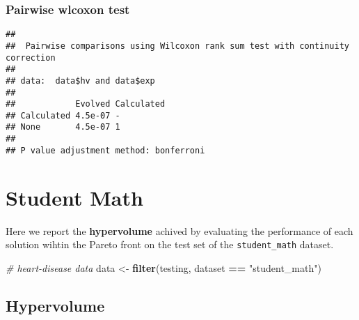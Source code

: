 \documentclass[
]{book}
\newenvironment{Shaded}{\begin{snugshade}}{\end{snugshade}}
\newcommand{\AttributeTok}[1]{\textcolor[rgb]{0.13,0.29,0.53}{#1}}
\newcommand{\CommentTok}[1]{\textcolor[rgb]{0.56,0.35,0.01}{\textit{#1}}}
\newcommand{\ConstantTok}[1]{\textcolor[rgb]{0.56,0.35,0.01}{#1}}
\newcommand{\FunctionTok}[1]{\textcolor[rgb]{0.13,0.29,0.53}{\textbf{#1}}}
\newcommand{\NormalTok}[1]{#1}
\newcommand{\OtherTok}[1]{\textcolor[rgb]{0.56,0.35,0.01}{#1}}
\newcommand{\SpecialCharTok}[1]{\textcolor[rgb]{0.81,0.36,0.00}{\textbf{#1}}}
\newcommand{\StringTok}[1]{\textcolor[rgb]{0.31,0.60,0.02}{#1}}
\begin{document}
\hypertarget{pairwise-wlcoxon-test}{%
\subsection{Pairwise wlcoxon test}\label{pairwise-wlcoxon-test}}

\begin{Shaded}
\end{Shaded}

\begin{verbatim}
## 
##  Pairwise comparisons using Wilcoxon rank sum test with continuity correction 
## 
## data:  data$hv and data$exp 
## 
##            Evolved Calculated
## Calculated 4.5e-07 -         
## None       4.5e-07 1         
## 
## P value adjustment method: bonferroni
\end{verbatim}

\hypertarget{student-math}{%
\chapter{Student Math}\label{student-math}}

Here we report the \textbf{hypervolume} achived by evaluating the performance of each solution wihtin the Pareto front on the test set of the \texttt{student\_math} dataset.

\begin{Shaded}
\begin{Highlighting}[]
\CommentTok{\# heart{-}disease data}
\NormalTok{data }\OtherTok{\textless{}{-}} \FunctionTok{filter}\NormalTok{(testing, dataset }\SpecialCharTok{==} \StringTok{"student\_math"}\NormalTok{)}
\end{Highlighting}
\end{Shaded}

\hypertarget{hypervolume-1}{%
\section{Hypervolume}\label{hypervolume-1}}
\end{document}
